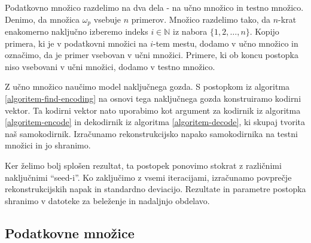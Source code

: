 \documentclass[12pt,a4paper,twoside]{article}
\theoremstyle{definition} %
\theoremstyle{plain} %
\numberwithin{equation}{section}  %
\newcommand{\N}{\mathbb N}
\begin{document}


Podatkovno množico razdelimo na dva dela - na učno množico in testno množico.
Denimo, da množica $\omega_p$ vsebuje $n$ primerov.
Množico razdelimo tako, da $n$-krat enakomerno naključno izberemo indeks $i \in \N$ iz nabora $\{1,2,\ldots,n\}$.
Kopijo primera, ki je v podatkovni množici na $i$-tem mestu, dodamo v učno množico in označimo, da je primer vsebovan v učni množici.
Primere, ki ob koncu postopka niso vsebovani v učni množici, dodamo v testno množico.

Z učno množico naučimo model naključnega gozda. %
S postopkom iz algoritma \ref{algoritem-find-encoding} na osnovi tega naključnega gozda konstruiramo kodirni vektor.
Ta kodirni vektor nato uporabimo kot argument za kodirnik iz algoritma \ref{algoritem-encode} in dekodirnik iz algoritma \ref{algoritem-decode}, ki skupaj tvorita naš samokodirnik.
Izračunamo rekonstrukcijsko napako samokodirnika na testni množici in jo shranimo.

Ker želimo bolj splošen rezultat, ta postopek ponovimo stokrat z različnimi naključnimi ``seed-i''.
Ko zaključimo z vsemi iteracijami, izračunamo povprečje rekonstrukcijskih napak in standardno deviacijo.
Rezultate in parametre postopka shranimo v datoteke za beleženje in nadaljnjo obdelavo.


\subsection{Podatkovne množice}
\end{document}
